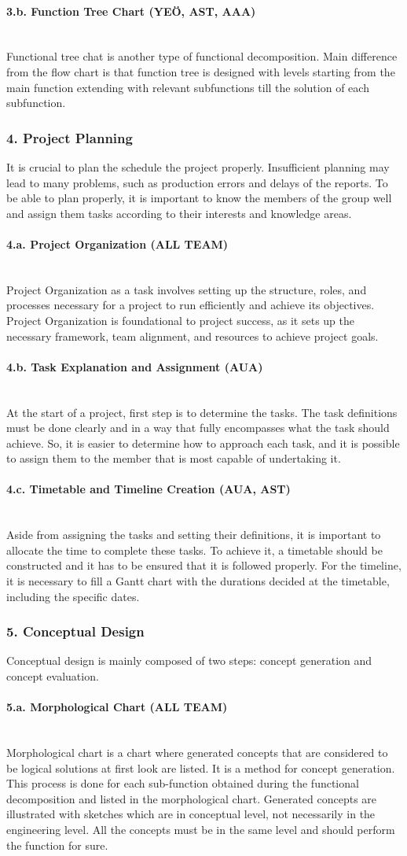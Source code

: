 \documentclass[12pt]{article}
\newcommand{\paragraphs}[1]{\paragraph*{#1}\mbox{}\\}
\begin{document}
\paragraphs{3.b. Function Tree Chart (YEÖ, AST, AAA)}
Functional tree chat is another type of functional decomposition. Main difference from the flow chart is that function tree is designed with levels starting from the main function extending with relevant subfunctions till the solution of each subfunction. 

\subsubsection*{4. Project Planning }
It is crucial to plan the schedule the project properly. Insufficient planning may lead to many problems, such as production errors and delays of the reports. To be able to plan properly, it is important to know the members of the group well and assign them tasks according to their interests and knowledge areas. 

\paragraphs{4.a. Project Organization (ALL TEAM)}
Project Organization as a task involves setting up the structure, roles, and processes necessary for a project to run efficiently and achieve its objectives. Project Organization is foundational to project success, as it sets up the necessary framework, team alignment, and resources to achieve project goals. 

\paragraphs{4.b. Task Explanation and Assignment (AUA)}
At the start of a project, first step is to determine the tasks. The task definitions must be done clearly and in a way that fully encompasses what the task should achieve. So, it is easier to determine how to approach each task, and it is possible to assign them to the member that is most capable of undertaking it. 

\paragraphs{4.c. Timetable and Timeline Creation (AUA, AST)}
Aside from assigning the tasks and setting their definitions, it is important to allocate the time to complete these tasks. To achieve it, a timetable should be constructed and it has to be ensured that it is followed properly. For the timeline, it is necessary to fill a Gantt chart with the durations decided at the timetable, including the specific dates. 

\subsubsection*{5. Conceptual Design}
Conceptual design is mainly composed of two steps: concept generation and concept evaluation. 

\paragraphs{5.a. Morphological Chart (ALL TEAM)}
Morphological chart is a chart where generated concepts that are considered to be logical solutions at first look are listed. It is a method for concept generation. This process is done for each sub-function obtained during the functional decomposition and listed in the morphological chart. Generated concepts are illustrated with sketches which are in conceptual level, not necessarily in the engineering level. All the concepts must be in the same level and should perform the function for sure.
\end{document}
